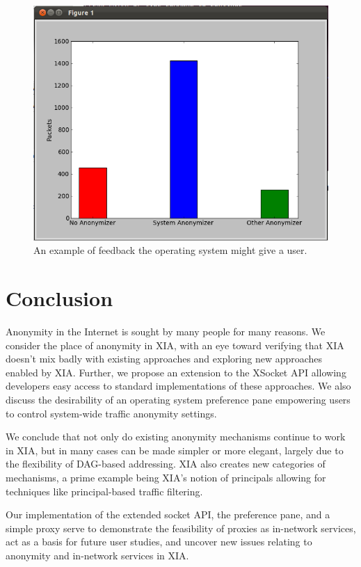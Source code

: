 \documentclass{article}
\begin{document}
\begin{figure}
\centering
\includegraphics[scale=0.3]{images/feedback.png}
\caption{An example of feedback the operating system might give a user.}
\label{fig:feedback}
\end{figure}


\section{Conclusion}
\label{conclusion}
Anonymity in the Internet is sought by many people for many reasons. We consider the place of anonymity in XIA, with an eye toward verifying that XIA doesn't mix badly with existing approaches and exploring new approaches enabled by XIA. Further, we propose an extension to the XSocket API allowing developers easy access to standard implementations  of these approaches. We also discuss the desirability of an operating system preference pane empowering users to control system-wide traffic anonymity settings.

We conclude that not only do existing anonymity mechanisms continue to work in XIA, but in many cases can be made simpler or more elegant, largely due to the flexibility of DAG-based addressing. XIA also creates new categories of mechanisms, a prime example being XIA's notion of principals allowing for techniques like principal-based traffic filtering.

Our implementation of the extended socket API, the preference pane, and a simple proxy serve to demonstrate the feasibility of proxies as in-network services, act as a basis for future user studies, and uncover new issues relating to anonymity and in-network services in XIA.

{}

\end{document}

